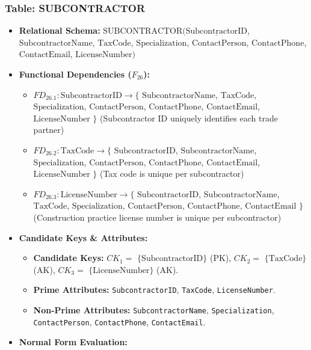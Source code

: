 \documentclass[a4paper,12pt]{report}
\begin{document}
\subsubsection{Table: SUBCONTRACTOR}\label{table-subcontractor}

\begin{itemize}
\item
  \textbf{Relational Schema:} \(\text{SUBCONTRACTOR}(\underline{\text{SubcontractorID}}\), \(\text{SubcontractorName}\), \(\text{TaxCode}\), \(\text{Specialization}\), \(\text{ContactPerson}\), \(\text{ContactPhone}\), \(\text{ContactEmail}\), \(\text{LicenseNumber})\)
\item
  \textbf{Functional Dependencies (\(F_{26}\)):}

  \begin{itemize}
  \item
    \(FD_{26.1}: \text{SubcontractorID} \rightarrow \{\) \(\text{SubcontractorName}\), \(\text{TaxCode}\), \(\text{Specialization}\), \(\text{ContactPerson}\), \(\text{ContactPhone}\), \(\text{ContactEmail}\), \(\text{LicenseNumber}\) \(\}\) (Subcontractor ID uniquely identifies each trade partner)
  \item
    \(FD_{26.2}: \text{TaxCode} \rightarrow \{\) \(\text{SubcontractorID}\), \(\text{SubcontractorName}\), \(\text{Specialization}\), \(\text{ContactPerson}\), \(\text{ContactPhone}\), \(\text{ContactEmail}\), \(\text{LicenseNumber}\) \(\}\) (Tax code is unique per subcontractor)
  \item
    \(FD_{26.3}: \text{LicenseNumber} \rightarrow \{\) \(\text{SubcontractorID}\), \(\text{SubcontractorName}\), \(\text{TaxCode}\), \(\text{Specialization}\), \(\text{ContactPerson}\), \(\text{ContactPhone}\), \(\text{ContactEmail}\) \(\}\) (Construction practice license number is unique per subcontractor)
  \end{itemize}
\item
  \textbf{Candidate Keys \& Attributes:}

  \begin{itemize}
  \item
    \textbf{Candidate Keys:} \(CK_{1} =\) \(\{\text{SubcontractorID}\}\) (PK), \(CK_{2} =\) \(\{\text{TaxCode}\}\) (AK), \(CK_{3} =\) \(\{\text{LicenseNumber}\}\) (AK).
  \item
    \textbf{Prime Attributes:} \texttt{SubcontractorID}, \texttt{TaxCode}, \texttt{LicenseNumber}.
  \item
    \textbf{Non-Prime Attributes:} \texttt{SubcontractorName}, \texttt{Specialization}, \texttt{ContactPerson}, \texttt{ContactPhone}, \texttt{ContactEmail}.
  \end{itemize}
\item
  \textbf{Normal Form Evaluation:}


\end{itemize}
\end{document}
